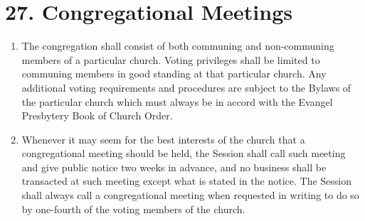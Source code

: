 \documentclass[
]{book}
\begin{document}
\hypertarget{congregational-meetings}{%
\section*{27. Congregational Meetings}\label{congregational-meetings}}

\protect\hypertarget{chapter-slug-27-congregational-meetings}{\href{}{}}

\begin{enumerate}
\def\labelenumi{\arabic{enumi}.}
\item
  \protect\hypertarget{27}{\href{}{}} The congregation shall consist of both communing and non-communing members of a particular church. Voting privileges shall be limited to communing members in good standing at that particular church. Any additional voting requirements and procedures are subject to the Bylaws of the particular church which must always be in accord with the Evangel Presbytery Book of Church Order.
\item
  Whenever it may seem for the best interests of the church that a congregational meeting should be held, the Session shall call such meeting and give public notice two weeks in advance, and no business shall be transacted at such meeting except what is stated in the notice. The Session shall always call a congregational meeting when requested in writing to do so by one-fourth of the voting members of the church.


\end{enumerate}
\end{document}
